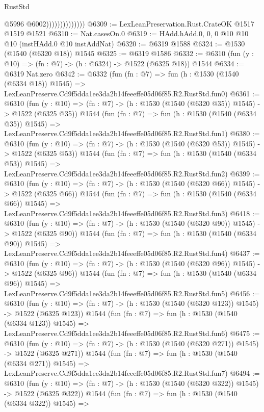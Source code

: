 \begin{lexlean}{RustStd}
\begin{coremodule}
                                @5996
                                @6002))))))))))))))
@6309 := LexLeanPreservation.Rust.CrateOK @1517 @1519 @1521
@6310 := Nat.casesOn.{0}
@6319 := HAdd.hAdd.{0, 0, 0} @10 @10 @10 (instHAdd.{0} @10 instAddNat)
@6320 := @6319 @1588
@6324 := @1530 (@1540 (@6320 @18)) @1545
@6325 := @6319 @1586
@6332 := @6310 (fun (y : @10) => (fn : @7) -> (h : @6324) -> @1522 (@6325 @18)) @1544
@6334 := @6319 Nat.zero
@6342 := @6332
    (fun (fn : @7) =>
    fun (h : @1530 (@1540 (@6334 @18)) @1545) =>
    LexLeanPreserve.Cd9f5dda1ee3da2b14feeeffe05d06f85.R2.RustStd.fun0)
@6361 := @6310
    (fun (y : @10) => (fn : @7) -> (h : @1530 (@1540 (@6320 @35)) @1545) -> @1522 (@6325 @35))
    @1544
    (fun (fn : @7) =>
    fun (h : @1530 (@1540 (@6334 @35)) @1545) =>
    LexLeanPreserve.Cd9f5dda1ee3da2b14feeeffe05d06f85.R2.RustStd.fun1)
@6380 := @6310
    (fun (y : @10) => (fn : @7) -> (h : @1530 (@1540 (@6320 @53)) @1545) -> @1522 (@6325 @53))
    @1544
    (fun (fn : @7) =>
    fun (h : @1530 (@1540 (@6334 @53)) @1545) =>
    LexLeanPreserve.Cd9f5dda1ee3da2b14feeeffe05d06f85.R2.RustStd.fun2)
@6399 := @6310
    (fun (y : @10) => (fn : @7) -> (h : @1530 (@1540 (@6320 @66)) @1545) -> @1522 (@6325 @66))
    @1544
    (fun (fn : @7) =>
    fun (h : @1530 (@1540 (@6334 @66)) @1545) =>
    LexLeanPreserve.Cd9f5dda1ee3da2b14feeeffe05d06f85.R2.RustStd.fun3)
@6418 := @6310
    (fun (y : @10) => (fn : @7) -> (h : @1530 (@1540 (@6320 @90)) @1545) -> @1522 (@6325 @90))
    @1544
    (fun (fn : @7) =>
    fun (h : @1530 (@1540 (@6334 @90)) @1545) =>
    LexLeanPreserve.Cd9f5dda1ee3da2b14feeeffe05d06f85.R2.RustStd.fun4)
@6437 := @6310
    (fun (y : @10) => (fn : @7) -> (h : @1530 (@1540 (@6320 @96)) @1545) -> @1522 (@6325 @96))
    @1544
    (fun (fn : @7) =>
    fun (h : @1530 (@1540 (@6334 @96)) @1545) =>
    LexLeanPreserve.Cd9f5dda1ee3da2b14feeeffe05d06f85.R2.RustStd.fun5)
@6456 := @6310
    (fun (y : @10) => (fn : @7) -> (h : @1530 (@1540 (@6320 @123)) @1545) -> @1522 (@6325 @123))
    @1544
    (fun (fn : @7) =>
    fun (h : @1530 (@1540 (@6334 @123)) @1545) =>
    LexLeanPreserve.Cd9f5dda1ee3da2b14feeeffe05d06f85.R2.RustStd.fun6)
@6475 := @6310
    (fun (y : @10) => (fn : @7) -> (h : @1530 (@1540 (@6320 @271)) @1545) -> @1522 (@6325 @271))
    @1544
    (fun (fn : @7) =>
    fun (h : @1530 (@1540 (@6334 @271)) @1545) =>
    LexLeanPreserve.Cd9f5dda1ee3da2b14feeeffe05d06f85.R2.RustStd.fun7)
@6494 := @6310
    (fun (y : @10) => (fn : @7) -> (h : @1530 (@1540 (@6320 @322)) @1545) -> @1522 (@6325 @322))
    @1544
    (fun (fn : @7) =>
    fun (h : @1530 (@1540 (@6334 @322)) @1545) =>

\end{coremodule}
\end{lexlean}
